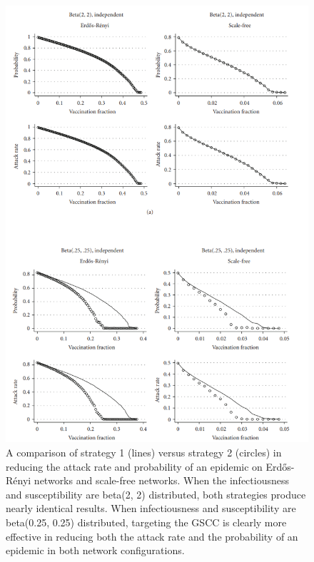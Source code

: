 \begin{figure}[h]
  \centering
  \includegraphics[width=12cm]{3/epigraphs}
  \caption{A comparison of strategy 1 (lines) versus strategy 2 (circles) in reducing the attack rate and probability of an epidemic on Erd\H{o}s-R\'{e}nyi networks and scale-free
    networks. When the infectiousness and susceptibility are beta(2, 2) distributed, both strategies produce nearly identical
  results. When infectiousness and susceptibility are beta(0.25, 0.25) distributed, targeting the GSCC is clearly more effective in reducing both the attack rate and the
probability of an epidemic in both network configurations.\cite{Kenah}}
  \label{fig:epidemiology graphs}
\end{figure}


